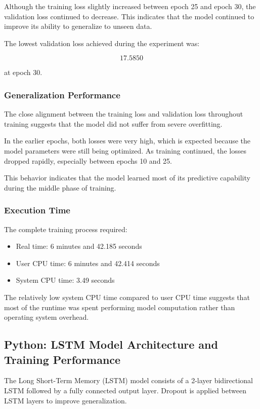 \documentclass[10pt,a4paper,twocolumn]{article}
\begin{document}
Although the training loss slightly increased between epoch 25 and epoch 30, the validation loss continued to decrease. This indicates that the model continued to improve its ability to generalize to unseen data.

The lowest validation loss achieved during the experiment was:

\[
17.5850
\]

at epoch 30.

\subsubsection{Generalization Performance}

The close alignment between the training loss and validation loss throughout training suggests that the model did not suffer from severe overfitting.

In the earlier epochs, both losses were very high, which is expected because the model parameters were still being optimized. As training continued, the losses dropped rapidly, especially between epochs 10 and 25.

This behavior indicates that the model learned most of its predictive capability during the middle phase of training.

\subsubsection{Execution Time}

The complete training process required:

\begin{itemize}
    \item Real time: 6 minutes and 42.185 seconds
    \item User CPU time: 6 minutes and 42.414 seconds
    \item System CPU time: 3.49 seconds
\end{itemize}

The relatively low system CPU time compared to user CPU time suggests that most of the runtime was spent performing model computation rather than operating system overhead.
\subsection{Python: LSTM Model Architecture and Training Performance}

The Long Short-Term Memory (LSTM) model consists of a 2-layer bidirectional LSTM followed by a fully connected output layer. Dropout is applied between LSTM layers to improve generalization.
\end{document}
